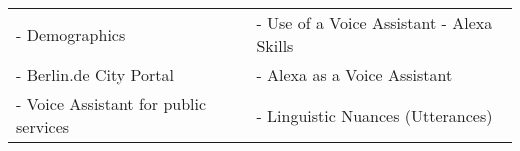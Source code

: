 %





\begin{table}[H]
	\begin{tabular} {l l}
		
		
- Demographics &
-	Use of a Voice Assistant  \quad\quad    - Alexa Skills \\	  
-	Berlin.de City Portal &
- 	Alexa as a Voice Assistant \\
-	Voice Assistant for public services  &

-	Linguistic Nuances (Utterances)\\
	\end{tabular}
\end{table}
%
%
%
%
%
%		


%
%




%
%


%	



